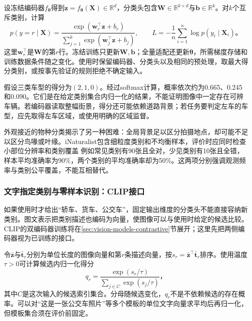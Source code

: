 设冻结编码器$f_{\bm{\theta}}$得到$\bm{z}=f_{\bm{\theta}}(\bm{X})\in\mathbb{R}^{d}$，分类头包含$\bm{W}\in\mathbb{R}^{k\times d}$与$\bm{b}\in\mathbb{R}^{k}$。对$k$个互斥类别，计算
\begin{equation}
 p(y=r\mid\bm{X})=
 \frac{\exp(\bm{w}_r^\top\bm{z}+b_r)}
 {\sum_{j=1}^{k}\exp(\bm{w}_j^\top\bm{z}+b_j)},
 \qquad
 L=-\frac1n\sum_{i=1}^{n}\log p(y_i\mid\bm{X}_i)\text{。}
 \label{eq:vision-linear-head}
\end{equation}
这里$\bm{w}_r^\top$是$\bm{W}$的第$r$行。冻结训练只更新$\bm{W},\bm{b}$；全量适配还更新$\bm{\theta}$，所需梯度存储和训练数据条件随之变化。使用时保留编码器、分类头以及相同的预处理，取最大得分类别，或按事先验证的规则拒绝不确定输入。

假设三类车型的得分为$(2,1,0)$。经过softmax计算，概率依次约为0.665、0.245和0.090。它们是在给定类别集合内归一化的结果，不能证明图像中一定存在可辨车辆。若编码器读取整幅街景，得分还可能依赖道路背景；若任务要判定左车的车型，应先取得左车区域，或使用明确的区域监督。

外观接近的物种分类揭示了另一种困难：全局背景足以区分拍摄地点，却可能不足以区分鸟喙或叶缘。iNaturalist包含细粒度类别和不均衡样本，评价时应同时检查小部位分辨率和类别覆盖
例如常见类别有90张且全对，少见类别有10张且全错，样本平均准确率为90\%，两个类别的平均准确率却为50\%。这两项分别强调观测频率与类别公平覆盖，不能互相替代。

\subsubsection{文字指定类别与零样本识别：CLIP接口}
\label{sec:vision-recognition-clip}

如果使用时才给出“轿车、货车、公交车”，固定输出维度的分类头不能直接容纳新类别。图文表示把类别描述也编码为向量，使图像可以与使用时给定的候选比较。CLIP的双编码器训练将在\ref{sec:vision-models-contrastive}节展开；这里先把两侧编码器视为已训练的接口。

令$\bar{\bm{z}}$与$\bar{\bm{t}}_r$分别为单位长度的图像向量和第$r$条描述向量，按$s_r=\bar{\bm{z}}^\top\bar{\bm{t}}_r$排序。使用温度$\tau>0$可计算候选内归一化得分
\begin{equation}
 q_r=\frac{\exp(s_r/\tau)}
 {\sum_{j\in C}\exp(s_j/\tau)}\text{，}
 \label{eq:vision-clip-classification}
\end{equation}
其中$C$是这次输入的候选索引集合。分母随候选变化，$q_r$不是不依赖候选的存在概率。可以对“这是一张公交车照片”等多个模板的单位文字向量求平均后再归一化，但模板集合须在评价前固定。

